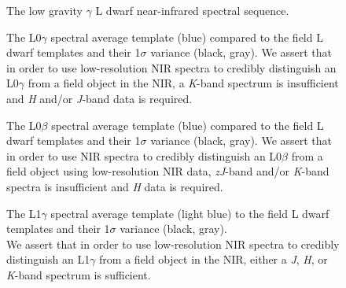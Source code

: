 \documentclass[12pt,preprint]{aastex}
\begin{document}


\begin{figure}
	\caption{The low gravity $\gamma$ L dwarf near-infrared spectral sequence.}
	\label{fig:lg_sequence}
\end{figure}




\begin{figure}
	\caption{The L0$\gamma$ spectral average template (blue) compared to the field L dwarf templates and their 1$\sigma$ variance (black, gray). We assert that in order to use low-resolution NIR spectra to credibly distinguish an L0$\gamma$ from a field object in the NIR, a \emph{K}-band spectrum is insufficient and \emph{H} and/or \emph{J}-band data is required.}
	\label{fig:L0lg-field}
\end{figure}

\begin{figure}
	\caption{The L0$\beta$ spectral average template (blue) compared to the field L dwarf templates and their 1$\sigma$ variance (black, gray). We assert that in order to use NIR spectra to credibly distinguish an L0$\beta$ from a field object using low-resolution NIR data, \emph{zJ}-band and/or \emph{K}-band spectra is insufficient and \emph{H} data is required.}
	\label{fig:L0b-field}
\end{figure}

\begin{figure}
	\caption{The L1$\gamma$ spectral average template (light blue) to the field L dwarf templates and their 1$\sigma$ variance (black, gray). \\
	We assert that in order to use low-resolution NIR spectra to credibly distinguish an L1$\gamma$ from a field object in the NIR, either a \emph{J}, \emph{H}, or \emph{K}-band spectrum is sufficient.}
	\label{fig:L1lg-field}
\end{figure}
\end{document}
